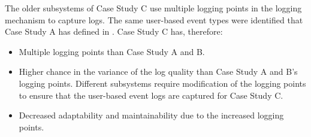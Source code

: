 The older subsystems of Case Study C use multiple logging points in the logging mechanism to capture logs. The same user-based event types were identified that Case Study A has defined in . Case Study C has, therefore:

\begin{itemize}
	\item Multiple logging points than Case Study A and B. 
	\item Higher chance in the variance of the log quality than Case Study A and B's logging points. Different subsystems require modification of the logging points to ensure that the user-based event logs are captured for Case Study C.
	\item Decreased adaptability and maintainability due to the increased logging points.
\end{itemize}


